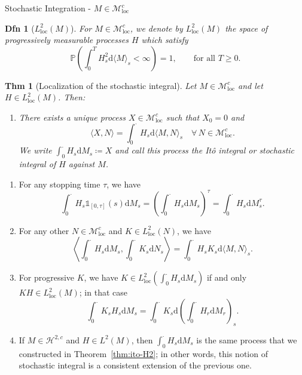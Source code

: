 \documentclass[a4paper]{article}
\theoremstyle{mytheoremstyle}
\newtheorem{definition}{Dfn}
\newtheorem{theorem}{Thm}
\newcommand{\1}{\mathds{1}}
\begin{document}
\begin{multicols*}{3}
\begin{roundbox}{Stochastic Integration - $M \in \mathcal{M}^c_{\operatorname{loc}}$}
\begin{definition}[$L^2_{\operatorname{loc}} (M)$]
  For $M \in \mathcal{M}^c_{\operatorname{loc}}$, we denote by $L^2_{\operatorname{loc}} (M)$
  the space of progressively measurable processes $H$ which satisfy
  \[ \mathbb{P} \left( \int_0^T H_s^2 \mathrm{d} \langle M \rangle_s < \infty
     \right) = 1, \qquad \text{for all } T \geqslant 0. \]
\end{definition}

\begin{theorem}[Localization of the stochastic integral]
  \label{th:stochintMloc}Let $M \in \mathcal{M}^c_{\operatorname{loc}}$ and let $H \in
  L^2_{\operatorname{loc}} (M)$. Then:
  \begin{enumerate}
    \item There exists a unique process $X \in \mathcal{M}^c_{\operatorname{loc}}$
    such that $X_0 = 0$ and
    \[ \langle X, N \rangle = \int_0^{\cdot} H_s \mathrm{d} \langle M, N
       \rangle_s \quad \forall \, N \in \mathcal{M}^c_{\operatorname{loc}} . \]
    We write $\int_0^{\cdot} H_s \mathrm{d} M_s \coloneq X$ and call this process
    the {\emph{It{\^o} integral}} or {\emph{stochastic integral}} of $H$
    against $M$.

  \end{enumerate}
\end{theorem}
\end{roundbox}
    
\begin{unlabeledbox}
\begin{enumerate}[start = 2]
    \item For any stopping time $\tau$, we have
    \[ \int_0^{\cdot} H_s \1_{[0, \tau]} (s) \mathrm{d} M_s = \left(
       \int_0^{\cdot} H_s \mathrm{d} M_s \right)^{\tau} = \int_0^{\cdot} H_s
       \mathrm{d} M_s^{\tau} . \]
    \item For any other $N \in \mathcal{M}^c_{\operatorname{loc}}$ and $K \in
    L^2_{\operatorname{loc}} (N)$, we have
    {
    \small
    \begin{equation}
      \left\langle \int_0^{\cdot} H_s \mathrm{d} M_s, \int_0^{\cdot} K_s
      \mathrm{d} N_s \right\rangle = \int_0^{\cdot} H_s K_s \mathrm{d} \langle M, N
      \rangle_s . \label{eq:qcv.stochint.Mloc}
    \end{equation}
    }
    \item For progressive $K$, we have $K \in L^2_{\operatorname{loc}} 
    (\int_0^{\cdot} H_s \mathrm{d} M_s)$ if and only $K H \in L^2_{\operatorname{loc}}
    (M)$; in that case
    \[ \int_0^{\cdot} K_s H_s \mathrm{d} M_s = \int_0^{\cdot} K_s \mathrm{d}
       \left( \int_0^{\cdot} H_r \mathrm{d} M_r \right)_s . \]
    \item If $M \in \mathcal{H}^{2, c}$ and $H \in L^2 (M)$, then
    $\int_0^{\cdot} H_s \mathrm{d} M_s$ is the same process that we constructed
    in Theorem~\ref{thm:ito-H2}; in other words, this notion of stochastic
    integral is a consistent extension of the previous one.
\end{enumerate}


\end{unlabeledbox}
\end{multicols*}
\end{document}

